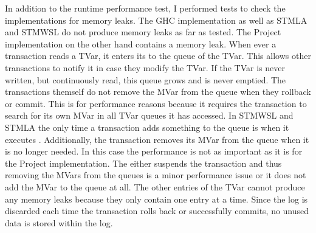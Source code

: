 In addition to the runtime performance test, I performed tests to check the implementations for memory leaks. The GHC implementation
as well as STMLA and STMWSL do not produce memory leaks as far as tested. The Project implementation on the other hand 
contains a memory leak. When ever a transaction reads a TVar, it enters its  to the queue of the TVar.
This allows other transactions to notify it in case they modify the TVar. If the TVar is never written, but continuously read, this queue grows
and is never emptied. The transactions themself do not remove the MVar from the queue when they rollback or commit.
This is for performance reasons because it requires the transaction to search for its own MVar in all TVar queues it 
has accessed. In STMWSL and STMLA the only time a transaction adds something to the queue is when it executes 
. Additionally, the transaction removes its MVar from the queue when it is no longer needed. In this 
case the performance is not as important as it is for the Project implementation. The  either suspends 
the transaction and thus removing the MVars from the queues is a minor performance issue or it does not add the MVar to
the queue at all. The other entries of the TVar cannot produce any memory leaks because they only contain one entry
at a time. Since the log is discarded each time the transaction rolls back or successfully commits, no unused data is stored
within the log.